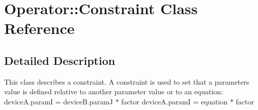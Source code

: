 \hypertarget{class_operator_1_1_constraint}{}\section{Operator\+:\+:Constraint Class Reference}
\label{class_operator_1_1_constraint}


\subsection{Detailed Description}
This class describes a constraint. A constraint is used to set that a parameter\textquotesingle{}s value is defined relative to another parameter value or to an equation\+: device\+A.\+paramI = device\+B.\+paramJ $\ast$ factor device\+A.\+paramI = equation $\ast$ factor 